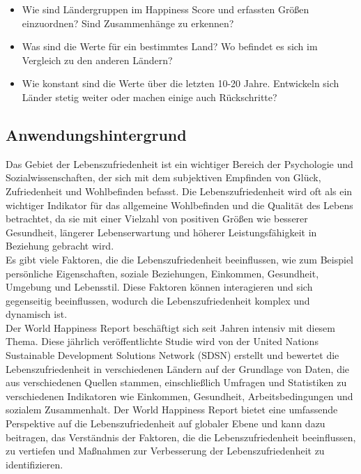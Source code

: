 \begin{itemize}
    \item Wie sind Ländergruppen im Happiness Score und erfassten Größen einzuordnen? Sind Zusammenhänge zu erkennen? 
    \item Was sind die Werte für ein bestimmtes Land? Wo befindet es sich im Vergleich zu den anderen Ländern? 
    \item Wie konstant sind die Werte über die letzten 10-20 Jahre. Entwickeln sich Länder stetig weiter oder machen einige auch Rückschritte?
\end{itemize}

\subsection{Anwendungshintergrund}
Das Gebiet der Lebenszufriedenheit ist ein wichtiger Bereich der Psychologie und Sozialwissenschaften, der sich mit dem subjektiven Empfinden von Glück, Zufriedenheit und Wohlbefinden befasst. \cite{frawley2015happiness} Die Lebenszufriedenheit wird oft als ein wichtiger Indikator für das allgemeine Wohlbefinden und die Qualität des Lebens betrachtet, da sie mit einer Vielzahl von positiven Größen wie besserer Gesundheit, längerer Lebenserwartung und höherer Leistungsfähigkeit in Beziehung gebracht wird. \cite{steptoe2019happiness}
\\

Es gibt viele Faktoren, die die Lebenszufriedenheit beeinflussen, wie zum Beispiel persönliche Eigenschaften, soziale Beziehungen, Einkommen, Gesundheit, Umgebung und Lebensstil. Diese Faktoren können interagieren und sich gegenseitig beeinflussen, wodurch die Lebenszufriedenheit komplex und dynamisch ist. \cite{fernandez2001contribution}
\\

Der World Happiness Report beschäftigt sich seit Jahren intensiv mit diesem Thema. Diese jährlich veröffentlichte Studie wird von der United Nations Sustainable Development Solutions Network (SDSN) erstellt und bewertet die Lebenszufriedenheit in verschiedenen Ländern auf der Grundlage von Daten, die aus verschiedenen Quellen stammen, einschließlich Umfragen und Statistiken zu verschiedenen Indikatoren wie Einkommen, Gesundheit, Arbeitsbedingungen und sozialem Zusammenhalt. \cite{helliwell_world_2021} Der World Happiness Report bietet eine umfassende Perspektive auf die Lebenszufriedenheit auf globaler Ebene und kann dazu beitragen, das Verständnis der Faktoren, die die Lebenszufriedenheit beeinflussen, zu vertiefen und Maßnahmen zur Verbesserung der Lebenszufriedenheit zu identifizieren. 


